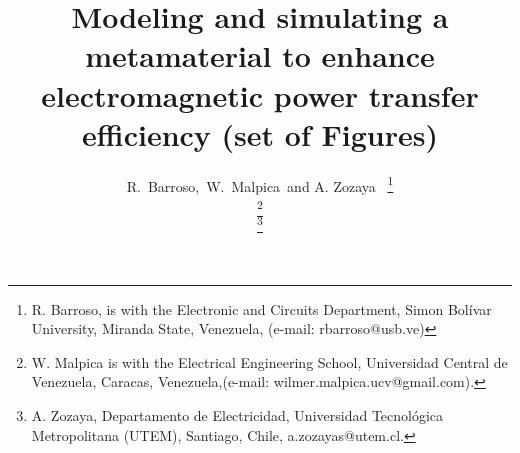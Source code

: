 \documentclass[journal]{IEEEtran}
\begin{document}
%
\title{Modeling and simulating a metamaterial to enhance electromagnetic power transfer efficiency (set of Figures)}
%
%
%




\author{R.~Barroso,~W.~Malpica~and A. Zozaya~%
\thanks{R. Barroso, is with the Electronic and Circuits Department, Simon Bol{\'i}var University, Miranda State, Venezuela, (e-mail: rbarroso@usb.ve)}%

\thanks{W. Malpica is with the Electrical Engineering School, Universidad Central de Venezuela, Caracas, Venezuela,(e-mail: wilmer.malpica.ucv@gmail.com).}

\thanks{A. Zozaya, Departamento de Electricidad, Universidad Tecnol{\'o}gica Metropolitana (UTEM), Santiago, Chile, a.zozayas@utem.cl.}

}

% 
%
\end{document}
